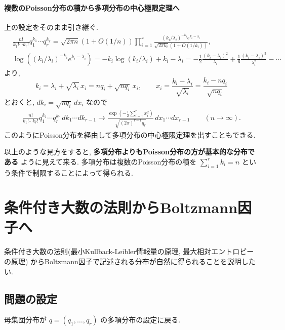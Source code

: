 \documentclass[12pt,twoside]{jarticle}
\theoremstyle{jplain}
\theoremstyle{jplain}
\theoremstyle{jplain}
\numberwithin{theorem}{section}
\numberwithin{equation}{section}
\numberwithin{figure}{section}
\numberwithin{table}{section}
\begin{document}
\paragraph{複数のPoisson分布の積から多項分布の中心極限定理へ}
上の設定をそのまま引き継ぐ.
\begin{align*}
&
\frac{n!}{k_1!\cdots k_r!} q_1^{k_1}\cdots q_r^{k_r}
=
\sqrt{2\pi n}(1+O(1/n))
\prod_{i=1}^r \frac{(k_i/\lambda_i)^{-k_i} e^{k_i-\lambda_i}}{\sqrt{2\pi k_i}(1+O(1/k_i))},
\\ &
\log((k_i/\lambda_i)^{-k_i}e^{k_i-\lambda_i})
=-k_i\log(k_i/\lambda_i)+k_i-\lambda_i
=-\frac{1}{2}\frac{(k_i-\lambda_i)^2}{\lambda_i}
+\frac{1}{6}\frac{(k_i-\lambda_i)^3}{\lambda_i^2}
-\cdots
\end{align*}
より, 
\[
k_i
=\lambda_i+\sqrt{\lambda_i}\,x_i
=nq_i+\sqrt{nq_i}\,x_i,
\qquad
x_i=\frac{k_i-\lambda_i}{\sqrt{\lambda_i}}=\frac{k_i-nq_i}{\sqrt{nq_i}}
\]
とおくと, $dk_i=\sqrt{nq_i}\,dx_i$ なので
\begin{align*}
\frac{n!}{k_1!\cdots k_r!} q_1^{k_1}\cdots q_r^{k_r}\,dk_1\cdots dk_{r-1}
\longrightarrow
\frac
{\exp\left(-\frac{1}{2}\sum_{i=1}^r x_i^2\right)}
{\sqrt{(2\pi)^{r-1}q_r}}
\,dx_1\cdots dx_{r-1}
\qquad (n\to\infty).
\end{align*}
このようにPoisson分布を経由して多項分布の中心極限定理を出すこともできる.

以上のような見方をすると, 
{\bf 多項分布よりもPoisson分布の方が基本的な分布である}
ように見えて来る. 多項分布は複数のPoisson分布の積を $\sum_{i=1}^r k_i=n$ 
という条件で制限することによって得られる.


\section{条件付き大数の法則からBoltzmann因子へ}
\label{sec:Boltzmann-factors}

条件付き大数の法則(最小Kullback-Leibler情報量の原理, 最大相対エントロピーの原理)
からBoltzmann因子で記述される分布が自然に得られることを説明したい.


\subsection{問題の設定}

母集団分布が $q=(q_1,\ldots,q_r)$ の多項分布の設定に戻る.
\end{document}
